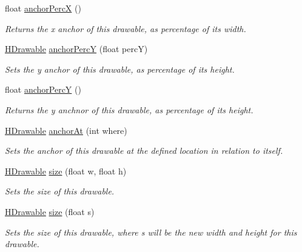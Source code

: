 \begin{DoxyCompactItemize}
float \hyperlink{classhype_1_1core_1_1drawable_1_1_h_drawable_a61972696a8beb2118f118de9cbab90aa}{anchor\-Perc\-X} ()
\begin{DoxyCompactList}\small\item\em Returns the x anchor of this drawable, as percentage of its width. \end{DoxyCompactList}\item 
\hyperlink{classhype_1_1core_1_1drawable_1_1_h_drawable}{H\-Drawable} \hyperlink{classhype_1_1core_1_1drawable_1_1_h_drawable_a39eeab51f73f45544942e50aa5c2c944}{anchor\-Perc\-Y} (float perc\-Y)
\begin{DoxyCompactList}\small\item\em Sets the y anchor of this drawable, as percentage of its height. \end{DoxyCompactList}\item 
float \hyperlink{classhype_1_1core_1_1drawable_1_1_h_drawable_aa533e99dd9d51a2c7c0dfbe9aa333fda}{anchor\-Perc\-Y} ()
\begin{DoxyCompactList}\small\item\em Returns the y anchnor of this drawable, as percentage of its height. \end{DoxyCompactList}\item 
\hyperlink{classhype_1_1core_1_1drawable_1_1_h_drawable}{H\-Drawable} \hyperlink{classhype_1_1core_1_1drawable_1_1_h_drawable_ab75ab965c009e70676767ba88016053c}{anchor\-At} (int where)
\begin{DoxyCompactList}\small\item\em Sets the anchor of this drawable at the defined location in relation to itself. \end{DoxyCompactList}\item 
\hyperlink{classhype_1_1core_1_1drawable_1_1_h_drawable}{H\-Drawable} \hyperlink{classhype_1_1core_1_1drawable_1_1_h_drawable_ae046413f91234f66dde997ef02908e24}{size} (float w, float h)
\begin{DoxyCompactList}\small\item\em Sets the size of this drawable. \end{DoxyCompactList}\item 
\hyperlink{classhype_1_1core_1_1drawable_1_1_h_drawable}{H\-Drawable} \hyperlink{classhype_1_1core_1_1drawable_1_1_h_drawable_a2c8b70fd46b03299178eb14ca57baaa4}{size} (float s)
\begin{DoxyCompactList}\small\item\em Sets the size of this drawable, where {\ttfamily s} will be the new width and height for this drawable. \end{DoxyCompactList}\item 

\end{DoxyCompactItemize}

